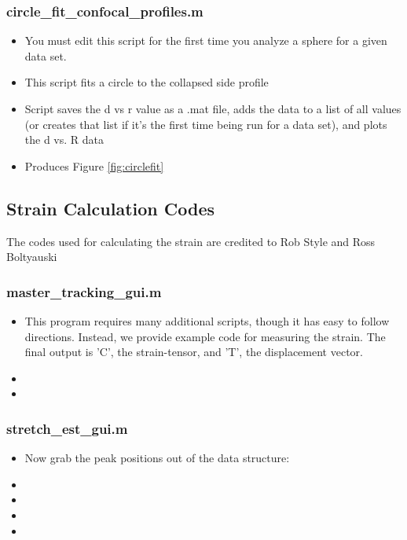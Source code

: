 \subsubsection*{circle\_fit\_confocal\_profiles.m}
\begin{itemize}
	\item You must edit this script for the first time you analyze a sphere for a given data set.
	\item This script fits a circle to the collapsed side profile
	\item Script saves the d vs r value as a .mat file, adds the \code{[d,R]} data to a list of all \code{[d,R]} values (or creates that list if it's the first time being run for a data set), and plots the d vs. R data
	\item Produces Figure \ref{fig:circlefit}
\end{itemize}

\subsection{Strain Calculation Codes}
The codes used for calculating the strain are credited to Rob Style and Ross Boltyauski
\subsubsection*{master\_tracking\_gui.m}
\begin{itemize}
	\item This program requires many additional scripts, though it has easy to follow directions. Instead, we provide example code for measuring the strain. The final output is 'C', the strain-tensor, and 'T', the displacement vector.
	\item {}
	\item {}
\end{itemize}
\subsubsection*{stretch\_est\_gui.m}
\begin{itemize}
	
	\item Now grab the peak positions out of the data structure:
	\item {}
	\item {}
	\item {}
	\item {}
	
\end{itemize}



